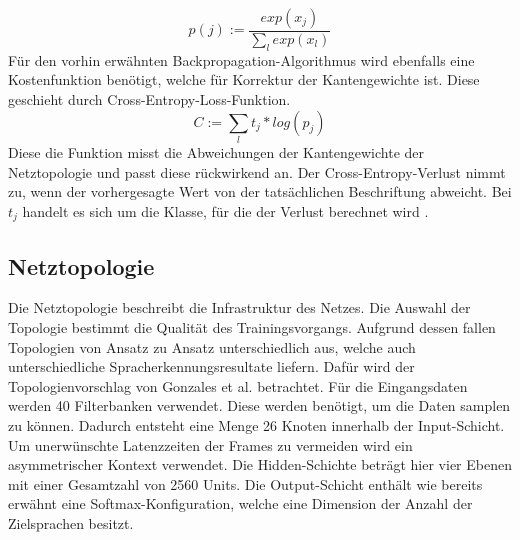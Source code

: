 \begin{equation*}
p(j) := \frac{ exp(x_{j}) }{\sum_{l}{}{ exp(x_{l})} }
\label{eq:soft}
\end{equation*}
Für den vorhin erwähnten Backpropagation-Algorithmus wird ebenfalls eine Kostenfunktion benötigt, welche für Korrektur der Kantengewichte ist. Diese geschieht durch Cross-Entropy-Loss-Funktion. 
\begin{equation*}
C:= \sum_{l}{}{ t_{j} * log(p_{j})} 
\label{eq:back}
\end{equation*}
Diese die Funktion misst die Abweichungen der Kantengewichte der Netztopologie und passt diese rückwirkend an. Der Cross-Entropy-Verlust nimmt zu, wenn der vorhergesagte Wert von der tatsächlichen Beschriftung abweicht\cite{MLCheatsheet.2017}. Bei $t_{j}$ handelt es sich um die Klasse, für die der Verlust berechnet wird \cite{GonzalezDominguez.2015}.

\subsection{Netztopologie}
Die Netztopologie beschreibt die Infrastruktur des Netzes. Die Auswahl der Topologie bestimmt die Qualität des Trainingsvorgangs. Aufgrund dessen fallen Topologien von Ansatz zu Ansatz unterschiedlich aus, welche auch unterschiedliche Spracherkennungsresultate liefern. Dafür wird der Topologienvorschlag von Gonzales et al. betrachtet. Für die Eingangsdaten werden 40 Filterbanken verwendet.
 Diese werden benötigt, um die Daten samplen zu können. Dadurch entsteht eine Menge 26 Knoten innerhalb der Input-Schicht. Um unerwünschte Latenzzeiten der Frames zu vermeiden wird ein asymmetrischer Kontext verwendet. Die Hidden-Schichte beträgt hier vier Ebenen mit einer Gesamtzahl von 2560 Units. Die Output-Schicht enthält wie bereits erwähnt eine Softmax-Konfiguration, welche eine Dimension der Anzahl der Zielsprachen besitzt.
 

